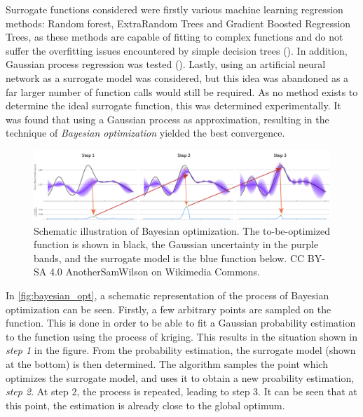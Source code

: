 Surrogate functions considered were firstly various machine learning regression methods: Random forest, ExtraRandom Trees and Gradient Boosted Regression Trees, as these methods are capable of fitting to complex functions and do not suffer the overfitting issues encountered by simple decision trees (\cite{DeepLearning}). In addition, Gaussian process regression was tested (\cite{Bayesian}). Lastly, using an artificial neural network as a surrogate model was considered, but this idea was abandoned as a far larger number of function calls would still be required. As no method exists to determine the ideal surrogate function, this was determined experimentally. It was found that using a Gaussian process as approximation, resulting in the technique of \textit{Bayesian optimization} yielded the best convergence. \\

\begin{figure}[htbp]
 \centering
 \includegraphics[width=1.0\textwidth]{img/bayesian_opt.png}
 \caption{Schematic illustration of Bayesian optimization. The to-be-optimized function is shown in black, the Gaussian uncertainty in the purple bands, and the surrogate model is the blue function below. CC BY-SA 4.0 AnotherSamWilson on Wikimedia Commons.}
 \label{fig:bayesian_opt}
\end{figure}

In \autoref{fig:bayesian_opt}, a schematic representation of the process of Bayesian optimization can be seen. Firstly, a few arbitrary points are sampled on the function. This is done in order to be able to fit a Gaussian probability estimation to the function using the process of kriging. This results in the situation shown in \textit{step 1} in the figure. From the probability estimation, the surrogate model (shown at the bottom) is then determined. The algorithm samples the point which optimizes the surrogate model, and uses it to obtain a new proability estimation, \textit{step 2}. At step 2, the process is repeated, leading to step 3. It can be seen that at this point, the estimation is already close to the global optimum. \\

